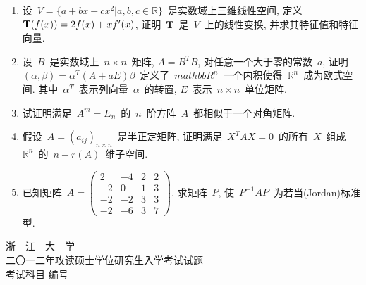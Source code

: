 \documentclass[UTF8,a4paper,11pt]{article}
\begin{document}
\begin{enumerate}
	      \vspace{2em}
	\item 设~$V=\{a+bx+cx^2|a,b,c\in\mathbb{R}\}$~是实数域上三维线性空间, 定义~$\mathbf{T}(f(x))=2f(x)+xf\rq{}(x)$, 证明~$\mathbf{T}$~是~$V$~上的线性变换, 并求其特征值和特征向量.
	      \vspace{2em}
	\item 设~$B$~是实数域上~$n\times n$~矩阵, $A=B^{T}B$, 对任意一个大于零的常数~$a$, 证明~$(\alpha,\beta)=\alpha^{T}(A+aE)\beta$~定义了~$mathbb{R}^{n}$~一个内积使得~$\mathbb{R}^n$~成为欧式空间. 其中~$\alpha^{T}$~表示列向量~$\alpha$~的转置, $E$~表示~$n\times n$~单位矩阵.
	      \vspace{2em}
	\item 试证明满足~$A^m=E_n$~的~$n$~阶方阵~$A$~都相似于一个对角矩阵.
	      \vspace{2em}
	\item 假设~$A=(a_{ij})_{n\times n}$~是半正定矩阵, 证明满足~$X^{T}AX=0$~的所有~$X$~组成~$\mathbb{R}^n$~的~$n-r(A)$~维子空间.
	      \vspace{2em}
	\item 已知矩阵~$A=\begin{pmatrix}2 & -4 & 2 & 2\\ -2 & 0 & 1 & 3\\ -2 & -2 & 3 & 3\\ -2 & -6 & 3 & 7\end{pmatrix}$, 求矩阵~$P$, 使~$P^{-1}AP$~为若当(Jordan)标准型.
	      \vspace{2em}
\end{enumerate}

\newpage
\setcounter{page}{1}

\begin{center}
	{\Huge 浙~~江~~大~~学}\\
	\setlength{\parskip}{5pt}
	{\Large 二〇一二年攻读硕士学位研究生入学考试试题}\\
	\setlength{\parskip}{10 pt}
	{\Large 考试科目\underline{} 编号\underline{}}
\end{center}
\end{document}

